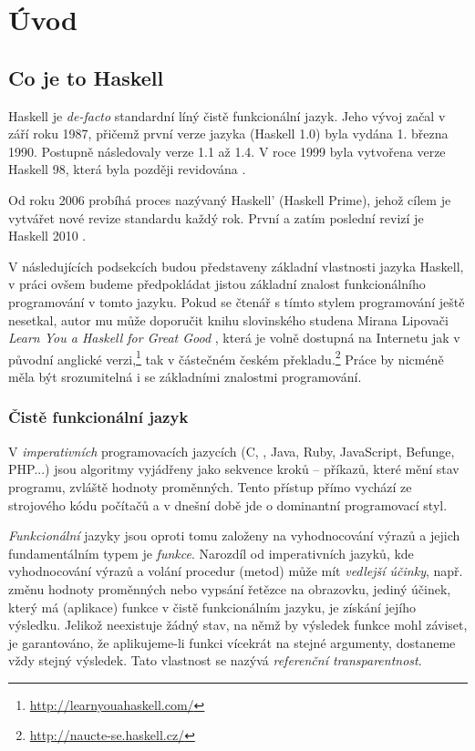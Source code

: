 \chapter{Úvod}

\section{Co je to Haskell}

Haskell je \textit{de-facto} standardní líný čistě funkcionální jazyk. Jeho
vývoj začal v září roku 1987, přičemž první verze jazyka (Haskell 1.0) byla
vydána 1. března 1990. Postupně následovaly verze 1.1 až 1.4. V roce 1999 byla
vytvořena  verze Haskell 98, která byla později revidována
\cite{jones2003haskell}. \cite{hudak2007history}

Od roku 2006 probíhá proces nazývaný Haskell' (Haskell Prime), jehož cílem je
vytvářet nové revize standardu každý rok. První a zatím poslední revizí je
Haskell 2010 \cite{haskellreport2010}.

V následujících podsekcích budou představeny základní vlastnosti jazyka Haskell,
v práci ovšem budeme předpokládat jistou základní znalost funkcionálního
programování v tomto jazyku. Pokud se čtenář s tímto stylem programování ještě
nesetkal, autor mu může doporučit knihu slovinského studena Mirana Lipovači
\emph{Learn You a Haskell for Great Good} \cite{lipovaca2011learn}, která je
volně dostupná na Internetu jak v původní anglické
verzi,\footnote{\url{http://learnyouahaskell.com/}} tak v částečném českém
překladu.\footnote{\url{http://naucte-se.haskell.cz/}} Práce by nicméně měla být
srozumitelná i se základními znalostmi  programování.

\subsection{Čistě funkcionální jazyk}

V \emph{imperativních} programovacích jazycích (C, \Cplusplus{}, Java, Ruby,
JavaScript, Befunge, PHP...) jsou algoritmy vyjádřeny jako sekvence kroků --
příkazů, které mění stav programu, zvláště hodnoty proměnných.  Tento přístup
přímo vychází ze strojového kódu počítačů a v dnešní době jde o dominantní
programovací styl.

\emph{Funkcionální} jazyky jsou oproti tomu založeny na vyhodnocování výrazů a
jejich fundamentálním typem je \emph{funkce}. Narozdíl od imperativních jazyků,
kde vyhodnocování výrazů a volání procedur (metod) může mít \emph{vedlejší
účinky}, např. změnu hodnoty proměnných nebo vypsání řetězce na obrazovku,
jediný účinek, který má  (aplikace) funkce v čistě funkcionálním
jazyku, je získání jejího výsledku. Jelikož neexistuje žádný stav, na němž by
výsledek funkce mohl záviset, je garantováno, že aplikujeme-li funkci vícekrát
na stejné argumenty, dostaneme vždy stejný výsledek. Tato vlastnost se nazývá
\emph{referenční transparentnost}.

